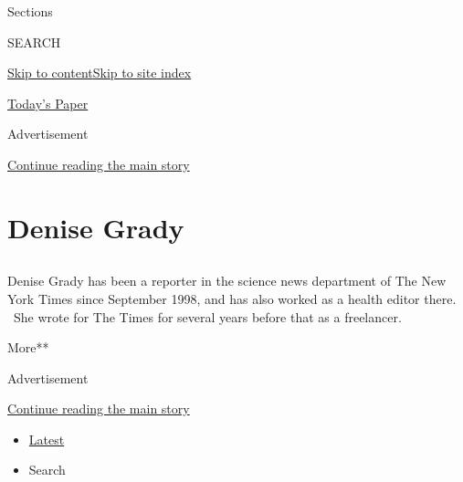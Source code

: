 Sections

SEARCH

\protect\hyperlink{site-content}{Skip to
content}\protect\hyperlink{site-index}{Skip to site index}

\href{https://myaccount.nytimes.com/auth/login?response_type=cookie\&client_id=vi}{}

\href{https://www.nytimes.com/section/todayspaper}{Today's Paper}

Advertisement

\protect\hyperlink{after-top}{Continue reading the main story}

\hypertarget{denise-grady}{%
\section{Denise Grady}\label{denise-grady}}

\subsection{}

Denise Grady has been a reporter in the science news department of The
New York Times since September 1998, and has also worked as a health
editor there. ~She wrote for The Times for several years before that as
a freelancer.

More**

Advertisement

\protect\hyperlink{after-mid1}{Continue reading the main story}

\begin{itemize}
\tightlist
\item
  \protect\hyperlink{stream-panel}{Latest}
\item
  Search
\end{itemize}

